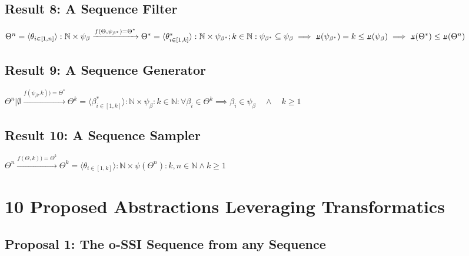 \documentclass[11pt,a4paper]{article}
\newcommand{\invpi}[1]{\mathop{\rotatebox[origin=c]{180}{$\pi$}}#1}
\begin{document}
\subsection{Result 8: A Sequence Filter\cite{transformatics}}

$\Theta^n = \langle \theta_{i \in [1,n]} \rangle : \mathbb{N} \times \psi_\beta \xrightarrow{f(\Theta,\psi_{\beta^*})=\Theta^*} \Theta^* = \langle \theta^*_{i \in [1,k]} \rangle : \mathbb{N} \times \psi_{\beta^*} ;\\ k \in \mathbb{N} : \psi_{\beta^*} \subseteq \psi_\beta \implies \invpi(\psi_{\beta^*}) = k \leq \invpi(\psi_\beta) \implies \invpi(\Theta^*) \leq \invpi(\Theta^n) $

\subsection{Result 9: A Sequence Generator\cite{transformatics}\cite{lutalo2025transformatic}}

$\Theta^n | \emptyset \xrightarrow{f(\psi_\beta,k))=\Theta^*} \Theta^k = \langle \beta^*_{i \in [1,k]} \rangle : \mathbb{N} \times \psi_{\beta} : k \in \mathbb{N} : \forall \beta_i \in \Theta^k \implies \beta_i \in \psi_\beta \quad \land \quad k \geq 1 $

\subsection{Result 10: A Sequence Sampler\cite{lutalo_2025_trans_genetics}}

$\Theta^n \xrightarrow{f(\Theta,k))=\Theta^k} \Theta^k = \langle \theta_{i \in [1,k]} \rangle : \mathbb{N} \times \psi(\Theta^n) : k,n \in \mathbb{N} \land k \geq 1$




\section{10 Proposed Abstractions Leveraging Transformatics}

\subsection{Proposal 1: The o-SSI Sequence from any Sequence\cite{ossipaper}}
\end{document}
